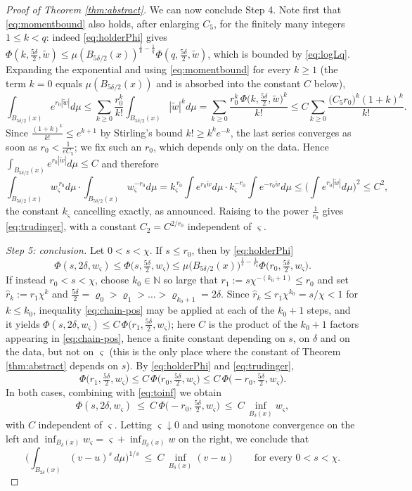 \documentclass[reqno]{amsart}
\theoremstyle{plain}
\theoremstyle{definition}
\theoremstyle{remark}
\newcommand{\N}{\mathbb{N}}
\begin{document}
\begin{proof}[Proof of Theorem \ref{thm:abstract}]
We can now conclude Step 4. Note first that \eqref{eq:momentbound} also holds, after enlarging
$C_5$, for the finitely many integers $1\le k<q$: indeed \eqref{eq:holderPhi} gives
$\Phi(k,\frac{5\delta}{2},\widetilde w)\le\mu(B_{5\delta/2}(x))^{\frac1k-\frac1q}\Phi(q,\frac{5\delta}{2},\widetilde w)$,
which is bounded by \eqref{eq:logLq}. Expanding the exponential and using \eqref{eq:momentbound}
for every $k\ge1$ (the term $k=0$ equals $\mu(B_{5\delta/2}(x))$ and is absorbed into the
constant $C$ below),
\[
\int_{B_{5\delta/2}(x)}e^{r_0|\widetilde w|}d\mu
\le\sum_{k\ge0}\frac{r_0^{k}}{k!}\int_{B_{5\delta/2}(x)}|\widetilde w|^{k}d\mu
=\sum_{k\ge0}\frac{r_0^{k}\,\Phi\big(k,\frac{5\delta}{2},\widetilde w\big)^{k}}{k!}
\le C\sum_{k\ge0}\frac{\big(C_5 r_0\big)^{k}(1+k)^{k}}{k!} .
\]
Since $\frac{(1+k)^{k}}{k!}\le e^{k+1}$ by Stirling's bound $k!\ge k^{k}e^{-k}$, the last series
converges as soon as $r_0<\frac{1}{eC_5}$; we fix such an $r_0$, which depends only on the data.
Hence $\int_{B_{5\delta/2}(x)}e^{r_0|\widetilde w|}d\mu\le C$ and therefore
\[
\int_{B_{5\delta/2}(x)}w_\varsigma^{\,r_0}d\mu\cdot\int_{B_{5\delta/2}(x)}w_\varsigma^{-r_0}d\mu
=k_\varsigma^{\,r_0}\!\int e^{r_0\widetilde w}d\mu\cdot k_\varsigma^{-r_0}\!\int e^{-r_0\widetilde w}d\mu
\le\Big(\int e^{r_0|\widetilde w|}d\mu\Big)^{2}\le C^{2} ,
\]
the constant $k_\varsigma$ cancelling exactly, as announced. Raising to the power $\frac1{r_0}$
gives \eqref{eq:trudinger}, with a constant $C_2=C^{2/r_0}$ independent of $\varsigma$.

\emph{Step 5: conclusion.} Let $0<s<\chi$. If $s\le r_0$, then by \eqref{eq:holderPhi}
\[
\Phi(s,2\delta,w_\varsigma)\le\Phi\big(s,\tfrac{5\delta}{2},w_\varsigma\big)
\le\mu\big(B_{5\delta/2}(x)\big)^{\frac1s-\frac1{r_0}}\Phi\big(r_0,\tfrac{5\delta}{2},w_\varsigma\big).
\]
If instead $r_0<s<\chi$, choose $k_0\in\N$ so large that $r_1:=s\chi^{-(k_0+1)}\le r_0$ and set
$\hat r_k:=r_1\chi^{k}$ and $\frac{5\delta}{2}=\varrho_0>\varrho_1>\dots>\varrho_{k_0+1}=2\delta$. Since
$\hat r_{k}\le r_1\chi^{k_0}=s/\chi<1$ for $k\le k_0$, inequality \eqref{eq:chain-pos} may be applied at
each of the $k_0+1$ steps, and it yields
$\Phi(s,2\delta,w_\varsigma)\le C\,\Phi\big(r_1,\frac{5\delta}{2},w_\varsigma\big)$; here $C$ is the
product of the $k_0+1$ factors appearing in \eqref{eq:chain-pos}, hence a finite constant depending
on $s$, on $\delta$ and on the data, but not on $\varsigma$ (this is the only place where the
constant of Theorem \ref{thm:abstract} depends on $s$). By
\eqref{eq:holderPhi} and \eqref{eq:trudinger},
\[
\Phi\big(r_1,\tfrac{5\delta}{2},w_\varsigma\big)\le C\,\Phi\big(r_0,\tfrac{5\delta}{2},w_\varsigma\big)
\le C\,\Phi\big(-r_0,\tfrac{5\delta}{2},w_\varsigma\big) .
\]
In both cases, combining with \eqref{eq:toinf} we obtain
\[
\Phi(s,2\delta,w_\varsigma)\ \le\ C\,\Phi\big(-r_0,\tfrac{5\delta}{2},w_\varsigma\big)
\ \le\ C\,\inf_{B_{\delta}(x)}w_\varsigma ,
\]
with $C$ independent of $\varsigma$. Letting $\varsigma\downarrow0$ and using monotone convergence
on the left and $\inf_{B_{\delta}(x)}w_\varsigma=\varsigma+\inf_{B_{\delta}(x)}w$ on the right, we
conclude that
\[
\Big(\int_{B_{2\delta}(x)}(v-u)^{s}\,d\mu\Big)^{1/s}\ \le\ C\,\inf_{B_{\delta}(x)}(v-u)
\qquad\text{for every }0<s<\chi .
\]


\end{proof}
\end{document}
